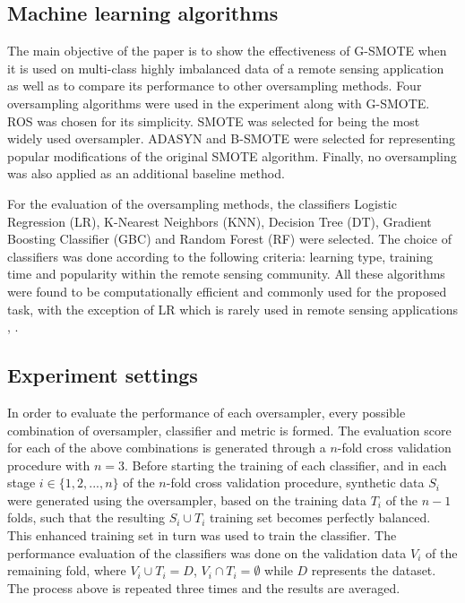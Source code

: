\documentclass[remotesensing,article,submit,moreauthors,pdftex]{Definitions/mdpi}
\begin{document}
\subsection{Machine learning algorithms}

The main objective of the paper is to show the effectiveness of G-SMOTE when it
is used on multi-class highly imbalanced data of a remote sensing application as
well as to compare its performance to other oversampling methods. Four
oversampling algorithms were used in the experiment along with G-SMOTE. ROS was
chosen for its simplicity. SMOTE was selected for being the most widely used
oversampler. ADASYN and B-SMOTE were selected for representing popular
modifications of the original SMOTE algorithm. Finally, no oversampling was also
applied as an additional baseline method.


For the evaluation of the oversampling methods, the classifiers Logistic
Regression (LR), K-Nearest Neighbors (KNN), Decision Tree (DT), Gradient
Boosting Classifier (GBC) and Random Forest (RF) were selected. The choice of
classifiers was done according to the following criteria: learning type,
training time and popularity within the remote sensing community. All these
algorithms were found to be computationally efficient and commonly used for the
proposed task, with the exception of LR which is rarely used in remote sensing
applications \cite{Khatami2016}, \cite{Maxwell2018}.

\subsection{Experiment settings}

In order to evaluate the performance of each oversampler, every possible
combination of oversampler, classifier and metric is formed. The evaluation
score for each of the above combinations is generated through a \( n \)-fold
cross validation procedure with \( n = 3 \). Before starting the training of
each classifier, and in each stage \(i \in \{1, 2 ,... , n \} \) of the \( n
\)-fold cross validation procedure, synthetic data \( S_{i} \) were generated
using the oversampler, based on the training data \(T_{i} \) of the \( n - 1 \)
folds, such that the resulting \(S_{i} \cup T_{i} \) training set becomes
perfectly balanced. This enhanced training set in turn was used to train the
classifier. The performance evaluation of the classifiers was done on the
validation data \( V_{i} \) of the remaining fold, where \(V_{i} \cup T_{i} = D
\), \(V_{i} \cap T_{i} = \emptyset \) while \( D \) represents the dataset. The
process above is repeated three times and the results are averaged.
\end{document}
